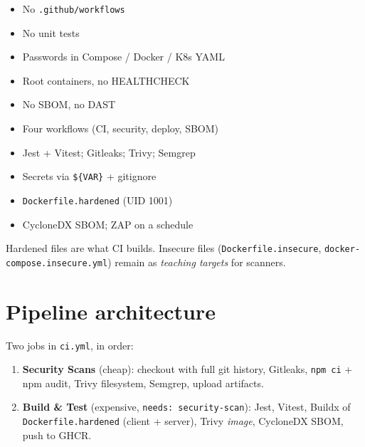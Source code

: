 \documentclass[11pt,a4paper]{article}
\begin{document}
\noindent
\begin{minipage}[t]{0.48\textwidth}
\begin{tcolorbox}[colback=white,colframe=redv,title=\textbf{Before --- no pipeline},fonttitle=\color{redv},boxrule=0.8pt,arc=2pt]
\begin{itemize}
  \item No \texttt{.github/workflows}
  \item No unit tests
  \item Passwords in Compose / Docker / K8s YAML
  \item Root containers, no HEALTHCHECK
  \item No SBOM, no DAST
\end{itemize}
\end{tcolorbox}
\end{minipage}\hfill
\begin{minipage}[t]{0.48\textwidth}
\begin{tcolorbox}[colback=white,colframe=greenv,title=\textbf{After --- DevSecOps path},fonttitle=\color{greenv},boxrule=0.8pt,arc=2pt]
\begin{itemize}
  \item Four workflows (CI, security, deploy, SBOM)
  \item Jest + Vitest; Gitleaks; Trivy; Semgrep
  \item Secrets via \texttt{\$\{VAR\}} + gitignore
  \item \texttt{Dockerfile.hardened} (UID 1001)
  \item CycloneDX SBOM; ZAP on a schedule
\end{itemize}
\end{tcolorbox}
\end{minipage}

\vspace{0.6em}
Hardened files are what CI builds. Insecure files (\texttt{Dockerfile.insecure}, \texttt{docker-compose.insecure.yml}) remain as \emph{teaching targets} for scanners.

\section{Pipeline architecture}
\label{sec:arch}
Two jobs in \texttt{ci.yml}, in order:

\begin{enumerate}
  \item \textbf{Security Scans} (cheap): checkout with full git history, Gitleaks, \texttt{npm ci} + npm audit, Trivy filesystem, Semgrep, upload artifacts.
  \item \textbf{Build \& Test} (expensive, \texttt{needs: security-scan}): Jest, Vitest, Buildx of \texttt{Dockerfile.hardened} (client + server), Trivy \emph{image}, CycloneDX SBOM, push to GHCR.
\end{enumerate}
\end{document}
